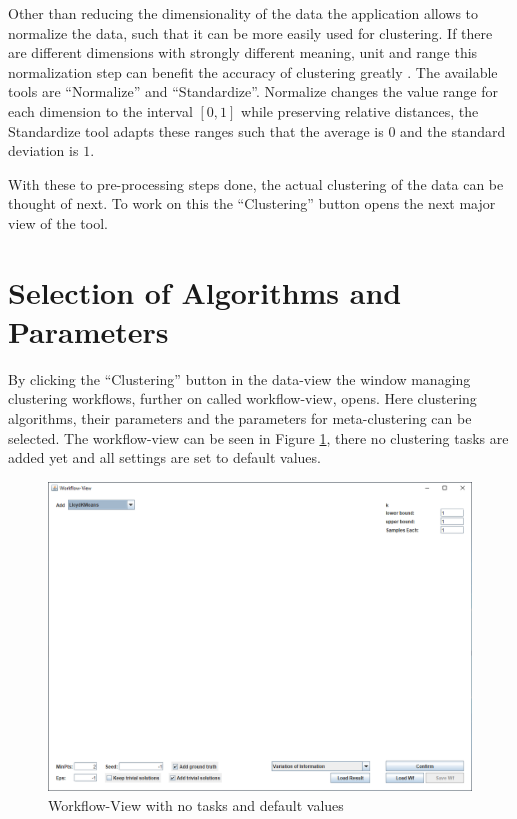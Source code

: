 \documentclass[
	a4paper,
	english,
	twoside,
	openright,               
	11pt                            
	]{report}
\begin{document}
Other than reducing the dimensionality of the data the application allows to normalize the data, such that it can be more easily used for clustering. If there are different dimensions with strongly different meaning, unit and range this normalization step can benefit the accuracy of clustering greatly \cite{normalization}. The available tools are ``Normalize'' and ``Standardize''. Normalize changes the value range for each dimension to the interval $[0,1]$ while preserving relative distances, the Standardize tool adapts these ranges such that the average is $0$ and the standard deviation is $1$.

With these to pre-processing steps done, the actual clustering of the data can be thought of next. To work on this the ``Clustering'' button opens the next major view of the tool.

\section{Selection of Algorithms and Parameters}\label{sec:sel_alg_param}
By clicking the ``Clustering'' button in the data-view the window managing clustering workflows, further on called workflow-view, opens. Here clustering algorithms, their parameters and the parameters for meta-clustering can be selected. The workflow-view can be seen in Figure \ref{fig:workflow-view}, there no clustering tasks are added yet and all settings are set to default values.

\begin{figure}[h]
	\centering
	\includegraphics[scale=.43]{workflow-view}
	\caption{Workflow-View with no tasks and default values}
	\label{fig:workflow-view}
\end{figure}
\end{document}
